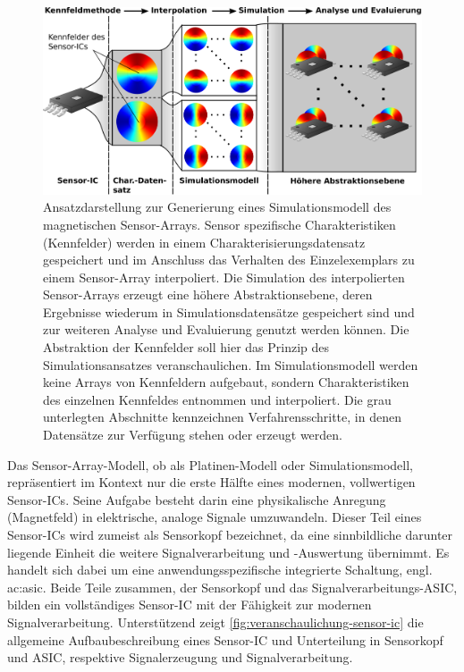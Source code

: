 \clearpage


\begin{figure}[tph]
	\centering
	\includegraphics[width=\linewidth]{chapters/images/Ansatz_Simulationsmodell}
	\caption[Ansatzdarstellung zur Generierung eines Simulationsmodell des magnetischen Sensor-Arrays]{Ansatzdarstellung zur Generierung eines Simulationsmodell des magnetischen Sensor-Arrays. Sensor spezifische Charakteristiken (Kennfelder) werden in einem Charakterisierungsdatensatz gespeichert und im Anschluss das Verhalten des Einzelexemplars zu einem Sensor-Array interpoliert. Die Simulation des interpolierten Sensor-Arrays erzeugt eine höhere Abstraktionsebene, deren Ergebnisse wiederum in Simulationsdatensätze gespeichert sind und zur weiteren Analyse und Evaluierung genutzt werden können. Die Abstraktion der Kennfelder soll hier das Prinzip des Simulationsansatzes veranschaulichen. Im Simulationsmodell werden keine Arrays von Kennfeldern aufgebaut, sondern Charakteristiken des einzelnen Kennfeldes entnommen und interpoliert. Die grau unterlegten Abschnitte kennzeichnen Verfahrensschritte, in denen Datensätze zur Verfügung stehen oder erzeugt werden.}
	\label{fig:ansatz-simulationsmodell}
\end{figure}


Das Sensor-Array-Modell, ob als Platinen-Modell oder Simulationsmodell, repräsentiert im Kontext nur die erste Hälfte eines modernen, vollwertigen Sensor-ICs. Seine Aufgabe besteht darin eine physikalische Anregung (Magnetfeld) in elektrische, analoge Signale umzuwandeln. Dieser Teil eines Sensor-ICs wird zumeist als Sensorkopf bezeichnet, da eine sinnbildliche darunter liegende Einheit die weitere Signalverarbeitung und -Auswertung übernimmt. Es handelt sich dabei um eine anwendungsspezifische integrierte Schaltung, engl. \gls{ac:asic}. Beide Teile zusammen, der Sensorkopf und das Signalverarbeitungs-ASIC, bilden ein vollständiges Sensor-IC mit der Fähigkeit zur modernen Signalverarbeitung.
Unterstützend zeigt \autoref{fig:veranschaulichung-sensor-ic} die allgemeine Aufbaubeschreibung eines Sensor-IC und Unterteilung in Sensorkopf und ASIC, respektive Signalerzeugung und Signalverarbeitung.


